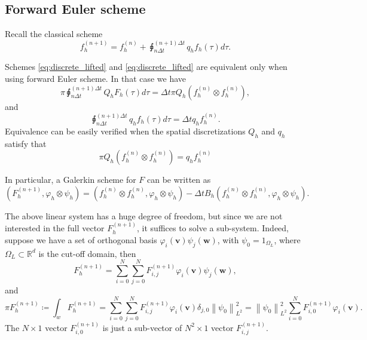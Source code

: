 \documentclass{article}
\numberwithin{equation}{section}
\begin{document}
\subsection{Forward Euler scheme}
Recall the classical scheme
\begin{equation}\label{eq:discrete_classical}
    f^{(n+1)}_{h} = f^{(n)}_{h} + \sqint_{n\Delta t}^{(n+1)\Delta t } q_{h}f_{h}(\tau) d\tau.
\end{equation}

Schemes \ref{eq:discrete_lifted} and \ref{eq:discrete_lifted} are equivalent only when using forward Euler scheme. In that case we have
\begin{equation*}
    \pi \sqint_{n\Delta t}^{(n+1)\Delta t } Q_{h}F_{h}(\tau) d\tau = \Delta t \pi Q_{h} (f^{(n)}_{h}\otimes f^{(n)}_{h}),
\end{equation*}
and
\begin{equation*}
    \sqint_{n\Delta t}^{(n+1)\Delta t } q_{h}f_{h}(\tau) d\tau = \Delta t q_{h} f_{h}^{(n)}.
\end{equation*}
Equivalence can be easily verified when the spatial discretizations $Q_{h}$ and $q_{h}$ satisfy that
\begin{equation*}
\pi Q_{h} (f^{(n)}_{h}\otimes f^{(n)}_{h}) = q_{h} f_{h}^{(n)}
\end{equation*}



\bigskip
In particular, a Galerkin scheme for $F$ can be written as
\begin{equation*}
\left(F_{h}^{(n+1)}, \varphi_{h}\otimes \psi_{h}\right) = \left(f_{h}^{(n)}\otimes f_{h}^{(n)}, \varphi_{h}\otimes \psi_{h}\right) - \Delta t B_{h}\left(f_{h}^{(n)}\otimes f_{h}^{(n)}, \varphi_{h}\otimes \psi_{h} \right).
\end{equation*}

The above linear system has a huge degree of freedom, but since we are not interested in the full vector $F^{(n+1)}_{h}$, it suffices to solve a sub-system. Indeed, suppose we have a set of orthogonal basis $\varphi_{i}(\mathbf{v})\psi_{j}(\mathbf{w})$, with $\psi_{0}=1_{\Omega_{L}}$, where $\Omega_{L}\subset \mathbb{R}^{d}$ is the cut-off domain, then  
\begin{equation*}
    F_{h}^{(n+1)} = \sum_{i=0}^{N}\sum_{j=0}^{N} F_{i,j}^{(n+1)}\varphi_{i}(\mathbf{v})\psi_{j}(\mathbf{w}),
\end{equation*}
and 
\begin{equation*}
    \pi F_{h}^{(n+1)} \coloneqq \int_{w}F_{h}^{(n+1)} = \sum_{i=0}^{N}\sum_{j=0}^{N} F_{i,j}^{(n+1)}\varphi_{i}(\mathbf{v})\delta_{j,0}\left\lVert \psi_{0}\right\rVert^{2}_{L^{2}} = \left\lVert \psi_{0}\right\rVert^{2}_{L^{2}}\sum_{i=0}^{N}F_{i,0}^{(n+1)}\varphi_{i}(\mathbf{v}) .
\end{equation*}
The $N \times 1$ vector $F_{i,0}^{(n+1)}$ is just a sub-vector of $N^{2}\times 1$ vector $F_{i,j}^{(n+1)}$. 
\end{document}
